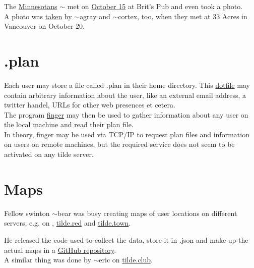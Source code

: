 The \href{http://tilde.club/~joeld/minnesota.html}{Minnesotans} $\sim$ met on \href{http://tilde.club/~joeld/#523}{October 15} at Brit’s Pub and even took a photo.\\

A photo was \href{http://tilde.club/~cortex/#0019}{taken} by $\sim$agray and $\sim$cortex, too, when they met at 33 Acres in Vancouver on October 20.
\section{.plan}
Each user may store a file called .plan in their home directory. This \href{https://en.wikipedia.org/wiki/Hidden_file_and_hidden_directory#Unix_and_Unix-like_environments}{dotfile} may contain arbitrary information about the user, like an external email address, a twitter handel, URLs for other web presences et cetera.\\

The program \href{https://en.wikipedia.org/wiki/Finger_protocol}{finger} may then be used to gather information about any user on the local machine and read their plan file.\\

In theory, finger may be used via TCP/IP to request plan files and information on users on remote machines, but the required service does not seem to be activated on any tilde server.

\section{Maps}
Fellow swinton $\sim$bear was busy creating maps of user locations on different servers, e.g. on \href{}{}, \href{https://tilde.red/~bear/where.html}{tilde.red} and \href{http://tilde.town/~bear/where.html}{tilde.town}.

He released the code used to collect the data, store it in .json and make up the actual maps in a \href{https://github.com/thebaer/tildes/blob/master/where/where.go}{GitHub repository}.
\\

A similar thing was done by $\sim$eric on \href{http://tilde.club/~eric/locations.html}{tilde.club}.
